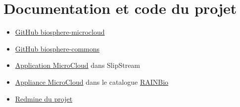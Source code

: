 \section {Documentation et code du projet}

\begin{itemize}
    \item \href{https://github.com/IFB-ElixirFr/biosphere-microcloud}{GitHub biosphere-microcloud}
    \item \href{https://github.com/IFB-ElixirFr/biosphere-commons}{GitHub biosphere-commons}
    \item \href{https://nuv.la/module/ifb/devzone/MicroCloud/}{Application MicroCloud} dans SlipStream
    \item \href{https://biosphere.france-bioinformatique.fr/catalogue/appliance/150/}{Appliance MicroCloud}
dans le catalogue \href{https://biosphere.france-bioinformatique.fr/catalogue/}{RAINBio}
    \item \href{https://intranet.genoscope.cns.fr/agc/redmine/projects/microcloud}{Redmine du projet}\\
\end{itemize}